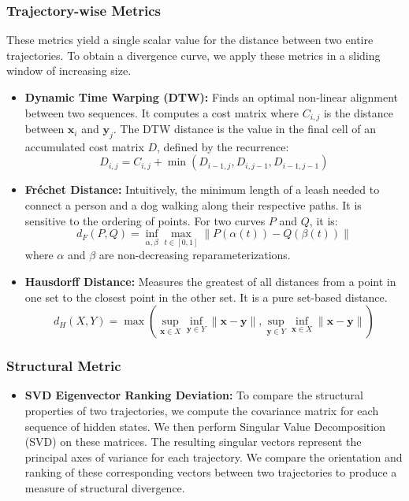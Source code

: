 \documentclass[a4paper,12pt]{article}
\begin{document}
\subsubsection{Trajectory-wise Metrics}
These metrics yield a single scalar value for the distance between two entire trajectories. To obtain a divergence curve, we apply these metrics in a sliding window of increasing size.
\begin{itemize}
    \item \textbf{Dynamic Time Warping (DTW):} Finds an optimal non-linear alignment between two sequences. It computes a cost matrix where $C_{i,j}$ is the distance between $\mathbf{x}_i$ and $\mathbf{y}_j$. The DTW distance is the value in the final cell of an accumulated cost matrix $D$, defined by the recurrence:
    \begin{equation}
        D_{i,j} = C_{i,j} + \min(D_{i-1, j}, D_{i, j-1}, D_{i-1, j-1})
    \end{equation}
    \item \textbf{Fréchet Distance:} Intuitively, the minimum length of a leash needed to connect a person and a dog walking along their respective paths. It is sensitive to the ordering of points. For two curves $P$ and $Q$, it is:
    \begin{equation}
        d_F(P, Q) = \inf_{\alpha, \beta} \max_{t \in [0,1]} \| P(\alpha(t)) - Q(\beta(t)) \|
    \end{equation}
    where $\alpha$ and $\beta$ are non-decreasing reparameterizations.
    \item \textbf{Hausdorff Distance:} Measures the greatest of all distances from a point in one set to the closest point in the other set. It is a pure set-based distance.
    \begin{equation}
        d_H(X, Y) = \max \left( \sup_{\mathbf{x} \in X} \inf_{\mathbf{y} \in Y} \|\mathbf{x}-\mathbf{y}\|, \sup_{\mathbf{y} \in Y} \inf_{\mathbf{x} \in X} \|\mathbf{x}-\mathbf{y}\| \right)
    \end{equation}
\end{itemize}

\subsubsection{Structural Metric}
\begin{itemize}
    \item \textbf{SVD Eigenvector Ranking Deviation:} To compare the structural properties of two trajectories, we compute the covariance matrix for each sequence of hidden states. We then perform Singular Value Decomposition (SVD) on these matrices. The resulting singular vectors represent the principal axes of variance for each trajectory. We compare the orientation and ranking of these corresponding vectors between two trajectories to produce a measure of structural divergence.
\end{itemize}
\end{document}
